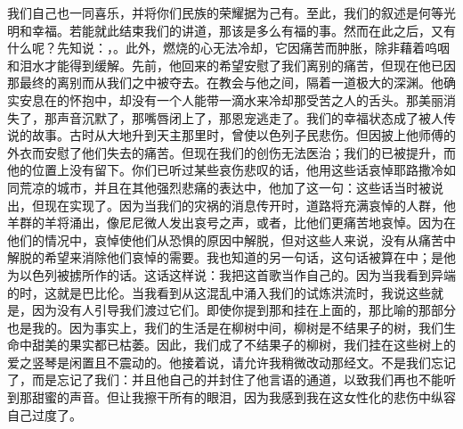 我们自己也一同喜乐，并将你们民族的荣耀据为己有。至此，我们的叙述是何等光明和幸福。若能就此结束我们的讲道，那该是多么有福的事。然而在此之后，又有什么呢？先知说：，。此外，燃烧的心无法冷却，它因痛苦而肿胀，除非藉着呜咽和泪水才能得到缓解。先前，他回来的希望安慰了我们离别的痛苦，但现在他已因那最终的离别而从我们之中被夺去。在教会与他之间，隔着一道极大的深渊。他确实安息在的怀抱中，却没有一个人能带一滴水来冷却那受苦之人的舌头。那美丽消失了，那声音沉默了，那嘴唇闭上了，那恩宠逃走了。我们的幸福状态成了被人传说的故事。古时从大地升到天主那里时，曾使以色列子民悲伤。但因披上他师傅的外衣而安慰了他们失去的痛苦。但现在我们的创伤无法医治；我们的已被提升，而他的位置上没有留下。你们已听过某些哀伤悲叹的话，他用这些话哀悼耶路撒冷如同荒凉的城市，并且在其他强烈悲痛的表达中，他加了这一句：这些话当时被说出，但现在实现了。因为当我们的灾祸的消息传开时，道路将充满哀悼的人群，他羊群的羊将涌出，像尼尼微人发出哀号之声，或者，比他们更痛苦地哀悼。因为在他们的情况中，哀悼使他们从恐惧的原因中解脱，但对这些人来说，没有从痛苦中解脱的希望来消除他们哀悼的需要。我也知道的另一句话，这句话被算在中；是他为以色列被掳所作的话。这话这样说：我把这首歌当作自己的。因为当我看到异端的时，这就是巴比伦。当我看到从这混乱中涌入我们的试炼洪流时，我说这些就是，因为没有人引导我们渡过它们。即使你提到那和挂在上面的，那比喻的那部分也是我的。因为事实上，我们的生活是在柳树中间，柳树是不结果子的树，我们生命中甜美的果实都已枯萎。因此，我们成了不结果子的柳树，我们挂在这些树上的爱之竖琴是闲置且不震动的。他接着说，请允许我稍微改动那经文。不是我们忘记了，而是忘记了我们：并且他自己的并封住了他言语的通道，以致我们再也不能听到那甜蜜的声音。但让我擦干所有的眼泪，因为我感到我在这女性化的悲伤中纵容自己过度了。\par

